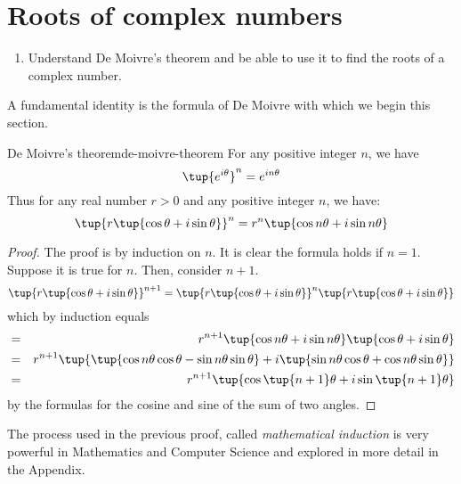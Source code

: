 \section{Roots of complex numbers}

\begin{outcome}
  \begin{enumerate}
  \item Understand De Moivre's theorem and be able to use it to find
    the roots of a complex number.
  \end{enumerate}
\end{outcome}

A fundamental identity is the
 formula of De Moivre with which we begin this section.

\begin{theorem}{De Moivre's theorem}{de-moivre-theorem}
For any positive integer $n$, we have
\begin{equation*}
\tup{e^{i \theta} }^n = e^{i n \theta}
\end{equation*}
Thus for any real number $r>0$ and any positive integer $n$, we have:
\begin{equation*}
\tup{r\tup{\cos \theta+i\sin \theta} } ^{n}=r^{n}\tup{\cos n \theta +i\sin
n\theta} 
\end{equation*}
\end{theorem}

\begin{proof}
 The proof is by induction on $n$. It is clear the formula holds if $n=1$. Suppose it is true
for $n$. Then, consider $n+1$.
\begin{equation*}
\tup{r\tup{\cos \theta+i\sin \theta} } ^{n+1}=\tup{r\tup{\cos
\theta+i\sin \theta} } ^{n}\tup{r\tup{\cos \theta+i\sin \theta} }
\end{equation*}
which by induction equals
\begin{eqnarray*}
&=&r^{n+1}\tup{\cos n\theta+i\sin n\theta} \tup{\cos \theta+i\sin \theta} \\
&=& r^{n+1}\tup{\tup{\cos n\theta\cos \theta-\sin n\theta\sin \theta} +i\tup{\sin
n\theta\cos \theta+\cos n\theta\sin \theta} }\\
&=&r^{n+1}\tup{\cos \tup{n+1} \theta+i\sin \tup{n+1} \theta}
\end{eqnarray*}
by the formulas for the cosine and sine of the sum of two angles. 
\end{proof}

The process used in the previous proof, called {\em mathematical
induction\em} is very powerful in Mathematics and Computer Science
and explored in more detail in the Appendix.

